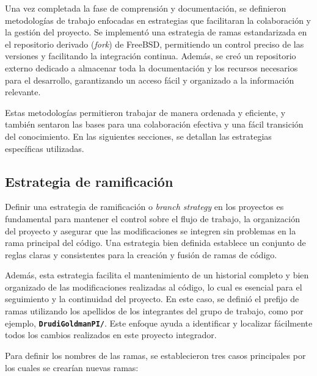 Una vez completada la fase de comprensión y documentación, se definieron metodologías de trabajo enfocadas en estrategias que facilitaran la colaboración y la gestión del proyecto. Se implementó una estrategia de ramas estandarizada en el repositorio derivado (\textit{fork}) de FreeBSD, permitiendo un control preciso de las versiones y facilitando la integración continua. Además, se creó un repositorio externo dedicado a almacenar toda la documentación y los recursos necesarios para el desarrollo, garantizando un acceso fácil y organizado a la información relevante.\par

Estas metodologías permitieron trabajar de manera ordenada y eficiente, y también sentaron las bases para una colaboración efectiva y una fácil transición del conocimiento. En las siguientes secciones, se detallan las estrategias específicas utilizadas.\par

\subsection{Estrategia de ramificación}
Definir una estrategia de ramificación o \textit{branch strategy} en los proyectos es fundamental para mantener el control sobre el flujo de trabajo, la organización del proyecto y asegurar que las modificaciones se integren sin problemas en la rama principal del código. Una estrategia bien definida establece un conjunto de reglas claras y consistentes para la creación y fusión de ramas de código.\par

Además, esta estrategia facilita el mantenimiento de un historial completo y bien organizado de las modificaciones realizadas al código, lo cual es esencial para el seguimiento y la continuidad del proyecto. En este caso, se definió el prefijo de ramas utilizando los apellidos de los integrantes del grupo de trabajo, como por ejemplo, \texttt{\textbf{DrudiGoldmanPI/}}. Este enfoque ayuda a identificar y localizar fácilmente todos los cambios realizados en este proyecto integrador.\par

Para definir los nombres de las ramas, se establecieron tres casos principales por los cuales se crearían nuevas ramas:

